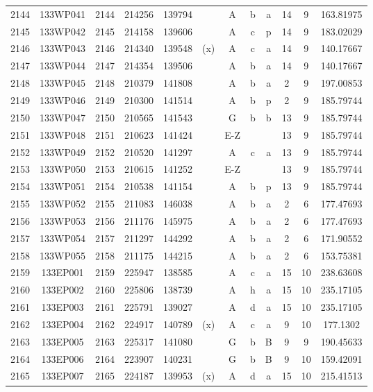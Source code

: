 \begin{tabular}{|*{12}{c|}}
2144 & 133WP041 & 2144 & 214256 & 139794 &  & A & b & a & 14 & 9 & 163.81975 \\ 
2145 & 133WP042 & 2145 & 214158 & 139606 &  & A & c & p & 14 & 9 & 183.02029 \\ 
2146 & 133WP043 & 2146 & 214340 & 139548 & (x) & A & c & a & 14 & 9 & 140.17667 \\ 
2147 & 133WP044 & 2147 & 214354 & 139506 &  & A & b & a & 14 & 9 & 140.17667 \\ 
2148 & 133WP045 & 2148 & 210379 & 141808 &  & A & b & a & 2 & 9 & 197.00853 \\ 
2149 & 133WP046 & 2149 & 210300 & 141514 &  & A & b & p & 2 & 9 & 185.79744 \\ 
2150 & 133WP047 & 2150 & 210565 & 141543 &  & G & b & b & 13 & 9 & 185.79744 \\ 
2151 & 133WP048 & 2151 & 210623 & 141424 &  & E-Z &  &  & 13 & 9 & 185.79744 \\ 
2152 & 133WP049 & 2152 & 210520 & 141297 &  & A & c & a & 13 & 9 & 185.79744 \\ 
2153 & 133WP050 & 2153 & 210615 & 141252 &  & E-Z &  &  & 13 & 9 & 185.79744 \\ 
2154 & 133WP051 & 2154 & 210538 & 141154 &  & A & b & p & 13 & 9 & 185.79744 \\ 
2155 & 133WP052 & 2155 & 211083 & 146038 &  & A & b & a & 2 & 6 & 177.47693 \\ 
2156 & 133WP053 & 2156 & 211176 & 145975 &  & A & b & a & 2 & 6 & 177.47693 \\ 
2157 & 133WP054 & 2157 & 211297 & 144292 &  & A & b & a & 2 & 6 & 171.90552 \\ 
2158 & 133WP055 & 2158 & 211175 & 144215 &  & A & b & a & 2 & 6 & 153.75381 \\ 
2159 & 133EP001 & 2159 & 225947 & 138585 &  & A & c & a & 15 & 10 & 238.63608 \\ 
2160 & 133EP002 & 2160 & 225806 & 138739 &  & A & h & a & 15 & 10 & 235.17105 \\ 
2161 & 133EP003 & 2161 & 225791 & 139027 &  & A & d & a & 15 & 10 & 235.17105 \\ 
2162 & 133EP004 & 2162 & 224917 & 140789 & (x) & A & c & a & 9 & 10 & 177.1302 \\ 
2163 & 133EP005 & 2163 & 225317 & 141080 &  & G & b & B & 9 & 9 & 190.45633 \\ 
2164 & 133EP006 & 2164 & 223907 & 140231 &  & G & b & B & 9 & 10 & 159.42091 \\ 
2165 & 133EP007 & 2165 & 224187 & 139953 & (x) & A & d & a & 15 & 10 & 215.41513 \\ 

\end{tabular}
